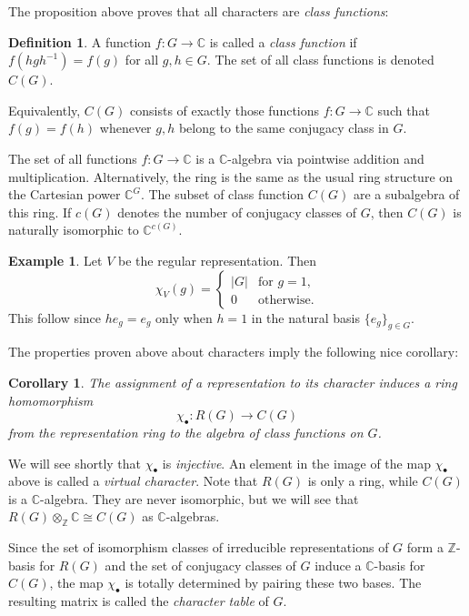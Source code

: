 \documentclass[12pt]{article}
\theoremstyle{plain}
\newtheorem{corollary}[theorem]{Corollary}
\theoremstyle{definition}
\newtheorem{definition}[theorem]{Definition}
\newtheorem{example}[theorem]{Example}
\theoremstyle{remark}
\numberwithin{equation}{section}
\begin{document}
The proposition above proves that all characters are \emph{class
functions}:

\begin{definition}
A function $f : G \to \mathbb{C}$ is called a \emph{class function}
if $f(hgh^{-1})=f(g)$ for all $g,h \in G$.
The set of all class functions is denoted $C(G)$.
\end{definition}

Equivalently, $C(G)$ consists of exactly those functions $f : G \to
\mathbb{C}$ such that $f(g)=f(h)$ whenever $g, h$ belong to the
same conjugacy class in $G$.

The set of all functions $f : G \to \mathbb{C}$ is a
$\mathbb{C}$-algebra via pointwise addition and multiplication.
Alternatively, the ring is the same as the usual ring structure on the
Cartesian power $\mathbb{C}^G$.
The subset of class function $C(G)$ are a subalgebra of this ring.
If $c(G)$ denotes the number of conjugacy classes of $G$,
then $C(G)$ is naturally isomorphic to $\mathbb{C}^{c(G)}$.

\begin{example} \label{eg:regular_rep}
Let $V$ be the regular representation.  Then
\[
\chi_V(g) = \begin{cases}
|G| & \textrm{for $g=1$},\\
0 & \textrm{otherwise}.
\end{cases}
\]
This follow since $he_g=e_g$ only when $h = 1$ in the natural basis $\{e_g\}_{g \in G}$.
\end{example}

The properties proven above about characters imply the following nice
corollary:

\begin{corollary}
The assignment of a representation to its character
induces a ring homomorphism
\[
\chi_{\bullet}: R(G) \to C(G)
\]
from the representation ring to the algebra of class functions on $G$.
\end{corollary}

We will see shortly that $\chi_{\bullet}$ is \emph{injective}.
An element in the image of the map $\chi_{\bullet}$ above is called a \emph{virtual
character}.  Note that $R(G)$ is only a ring, while $C(G)$ is a
$\mathbb{C}$-algebra.  They are never isomorphic, but we will see that
$R(G) \otimes_\mathbb{Z} \mathbb{C} \cong C(G)$ as $\mathbb{C}$-algebras.

Since the set of isomorphism classes of irreducible representations of
$G$ form a $\mathbb{Z}$-basis for $R(G)$
and the set of conjugacy classes of $G$
induce a $\mathbb{C}$-basis for $C(G)$,
the map $\chi_{\bullet}$ is totally determined by pairing these two bases.
The resulting matrix is called the \emph{character table} of $G$.
\end{document}
